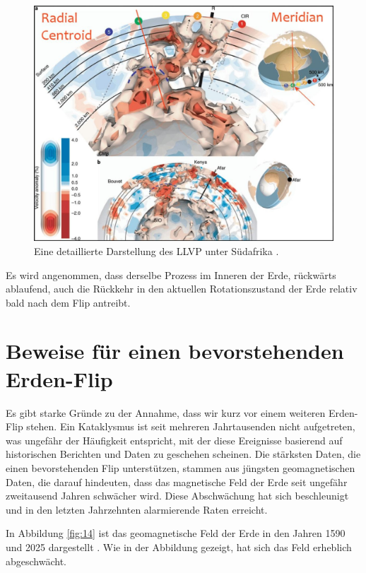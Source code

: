 \documentclass[10pt,twocolumn,letterpaper]{article}
\begin{document}
\begin{figure}[t]
\begin{center}
   \includegraphics[width=1\linewidth]{llvp.jpg}
\end{center}
   \caption{Eine detaillierte Darstellung des LLVP unter Südafrika \cite{28}.}
\label{fig:12}
\label{fig:onecol}
\end{figure}

Es wird angenommen, dass derselbe Prozess im Inneren der Erde, rückwärts ablaufend, auch die Rückkehr in den aktuellen Rotationszustand der Erde relativ bald nach dem Flip antreibt.

\section{Beweise für einen bevorstehenden Erden-Flip}

Es gibt starke Gründe zu der Annahme, dass wir kurz vor einem weiteren Erden-Flip stehen. Ein Kataklysmus ist seit mehreren Jahrtausenden nicht aufgetreten, was ungefähr der Häufigkeit entspricht, mit der diese Ereignisse basierend auf historischen Berichten und Daten zu geschehen scheinen. Die stärksten Daten, die einen bevorstehenden Flip unterstützen, stammen aus jüngsten geomagnetischen Daten, die darauf hindeuten, dass das magnetische Feld der Erde seit ungefähr zweitausend Jahren schwächer wird. Diese Abschwächung hat sich beschleunigt und in den letzten Jahrzehnten alarmierende Raten erreicht.

In Abbildung \ref{fig:14} ist das geomagnetische Feld der Erde in den Jahren 1590 und 2025 dargestellt \cite{125,126}. Wie in der Abbildung gezeigt, hat sich das Feld erheblich abgeschwächt.
\end{document}
